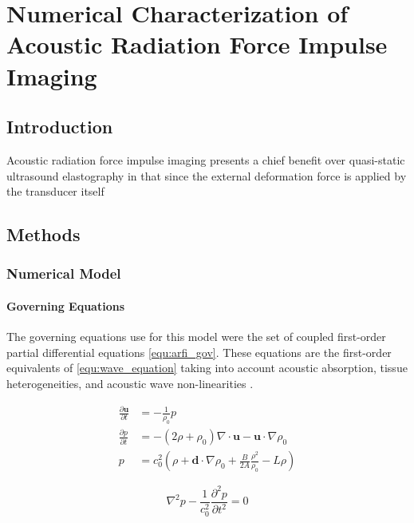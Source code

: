 \chapter{Numerical Characterization of Acoustic Radiation Force Impulse Imaging}
	\label{chap:arfi}
	\section{Introduction}
		Acoustic radiation force impulse imaging presents a chief benefit over quasi-static ultrasound elastography in that since the external deformation force is applied by the transducer itself

	\section{Methods}
		\subsection{Numerical Model}
			\subsubsection{Governing Equations}
				The governing equations use for this model were the set of coupled first-order partial differential equations \ref{equ:arfi_gov}. These equations are the first-order equivalents of \ref{equ:wave_equation} taking into account acoustic absorption, tissue heterogeneities, and acoustic wave non-linearities \cite{treeby12}.

				\begin{subequations}
					\label{equ:arfi_gov}
					\begin{align}
						\frac{\partial \mathbf{u}}{\partial t} &= - \frac{1}{\rho_0} p \label{equ:arfi_gov_p1} \\
						\frac{\partial p}{\partial t} &= -\left(2 \rho + \rho_0\right)\nabla \cdot \mathbf{u} - \mathbf{u} \cdot \nabla \rho_0 \label{equ:arfi_gov_p2} \\
						p &= c_0^2 \left(\rho + \mathbf{d} \cdot \nabla \rho_0 + \frac{B}{2A} \frac{\rho^2}{\rho_0} - L\rho \right) \label{equ:arfi_gov_p3}
					\end{align}
				\end{subequations}

				\begin{equation}
					\label{equ:wave_equation}
					\nabla^2 p - \frac{1}{c_0^2}\frac{\partial^2 p}{\partial t^2} = 0
				\end{equation}


